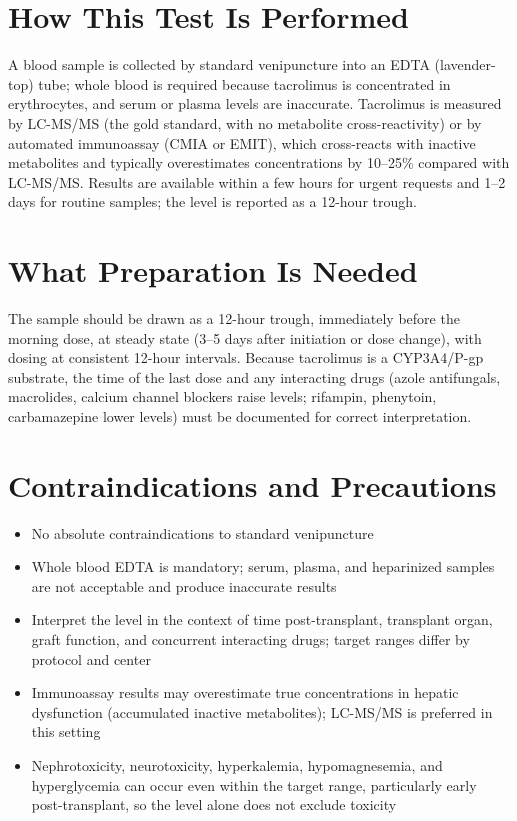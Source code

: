 \section*{How This Test Is Performed}
A blood sample is collected by standard venipuncture into an EDTA (lavender-top) tube; whole blood is required because tacrolimus is concentrated in erythrocytes, and serum or plasma levels are inaccurate. Tacrolimus is measured by LC-MS/MS (the gold standard, with no metabolite cross-reactivity) or by automated immunoassay (CMIA or EMIT), which cross-reacts with inactive metabolites and typically overestimates concentrations by 10--25\% compared with LC-MS/MS. Results are available within a few hours for urgent requests and 1--2 days for routine samples; the level is reported as a 12-hour trough.

\section*{What Preparation Is Needed}
The sample should be drawn as a 12-hour trough, immediately before the morning dose, at steady state (3--5 days after initiation or dose change), with dosing at consistent 12-hour intervals. Because tacrolimus is a CYP3A4/P-gp substrate, the time of the last dose and any interacting drugs (azole antifungals, macrolides, calcium channel blockers raise levels; rifampin, phenytoin, carbamazepine lower levels) must be documented for correct interpretation.

\section*{Contraindications and Precautions}
\begin{itemize}
  \item No absolute contraindications to standard venipuncture
  \item Whole blood EDTA is mandatory; serum, plasma, and heparinized samples are not acceptable and produce inaccurate results
  \item Interpret the level in the context of time post-transplant, transplant organ, graft function, and concurrent interacting drugs; target ranges differ by protocol and center
  \item Immunoassay results may overestimate true concentrations in hepatic dysfunction (accumulated inactive metabolites); LC-MS/MS is preferred in this setting
  \item Nephrotoxicity, neurotoxicity, hyperkalemia, hypomagnesemia, and hyperglycemia can occur even within the target range, particularly early post-transplant, so the level alone does not exclude toxicity
\end{itemize}

